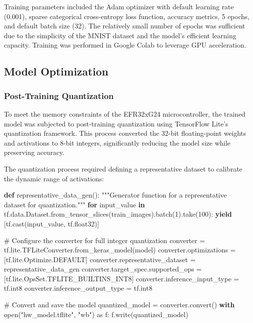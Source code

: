 \documentclass[
  9pt,
  letterpaper,
  abstract,
  titlepage]{scrbook}
\newenvironment{Shaded}{\begin{snugshade}}{\end{snugshade}}
\newcommand{\BuiltInTok}[1]{\textcolor[rgb]{0.00,0.23,0.31}{#1}}
\newcommand{\CommentTok}[1]{\textcolor[rgb]{0.37,0.37,0.37}{#1}}
\newcommand{\ControlFlowTok}[1]{\textcolor[rgb]{0.00,0.23,0.31}{\textbf{#1}}}
\newcommand{\DecValTok}[1]{\textcolor[rgb]{0.68,0.00,0.00}{#1}}
\newcommand{\ImportTok}[1]{\textcolor[rgb]{0.00,0.46,0.62}{#1}}
\newcommand{\KeywordTok}[1]{\textcolor[rgb]{0.00,0.23,0.31}{\textbf{#1}}}
\newcommand{\NormalTok}[1]{\textcolor[rgb]{0.00,0.23,0.31}{#1}}
\newcommand{\OperatorTok}[1]{\textcolor[rgb]{0.37,0.37,0.37}{#1}}
\newcommand{\StringTok}[1]{\textcolor[rgb]{0.13,0.47,0.30}{#1}}
\begin{document}
Training parameters included the Adam optimizer with default learning
rate (0.001), sparse categorical cross-entropy loss function, accuracy
metrics, 5 epochs, and default batch size (32). The relatively small
number of epochs was sufficient due to the simplicity of the MNIST
dataset and the model's efficient learning capacity. Training was
performed in Google Colab to leverage GPU acceleration.

\subsection{Model Optimization}\label{model-optimization}

\subsubsection{Post-Training
Quantization}\label{post-training-quantization}

To meet the memory constraints of the EFR32xG24 microcontroller, the
trained model was subjected to post-training quantization using
TensorFlow Lite's quantization framework. This process converted the
32-bit floating-point weights and activations to 8-bit integers,
significantly reducing the model size while preserving accuracy.

The quantization process required defining a representative dataset to
calibrate the dynamic range of activations:

\begin{Shaded}
\begin{Highlighting}[]
\KeywordTok{def}\NormalTok{ representative\_data\_gen():}
    \CommentTok{"""Generator function for a representative dataset for quantization."""}
    \ControlFlowTok{for}\NormalTok{ input\_value }\KeywordTok{in}\NormalTok{ tf.data.Dataset.from\_tensor\_slices(train\_images).batch(}\DecValTok{1}\NormalTok{).take(}\DecValTok{100}\NormalTok{):}
        \ControlFlowTok{yield}\NormalTok{ [tf.cast(input\_value, tf.float32)]}

\CommentTok{\# Configure the converter for full integer quantization}
\NormalTok{converter }\OperatorTok{=}\NormalTok{ tf.lite.TFLiteConverter.from\_keras\_model(model)}
\NormalTok{converter.optimizations }\OperatorTok{=}\NormalTok{ [tf.lite.Optimize.DEFAULT]}
\NormalTok{converter.representative\_dataset }\OperatorTok{=}\NormalTok{ representative\_data\_gen}
\NormalTok{converter.target\_spec.supported\_ops }\OperatorTok{=}\NormalTok{ [tf.lite.OpsSet.TFLITE\_BUILTINS\_INT8]}
\NormalTok{converter.inference\_input\_type }\OperatorTok{=}\NormalTok{ tf.int8}
\NormalTok{converter.inference\_output\_type }\OperatorTok{=}\NormalTok{ tf.int8}

\CommentTok{\# Convert and save the model}
\NormalTok{quantized\_model }\OperatorTok{=}\NormalTok{ converter.convert()}
\ControlFlowTok{with} \BuiltInTok{open}\NormalTok{(}\StringTok{"hw\_model.tflite"}\NormalTok{, }\StringTok{"wb"}\NormalTok{) }\ImportTok{as}\NormalTok{ f:}
\NormalTok{    f.write(quantized\_model)}
\end{Highlighting}
\end{Shaded}
\end{document}
